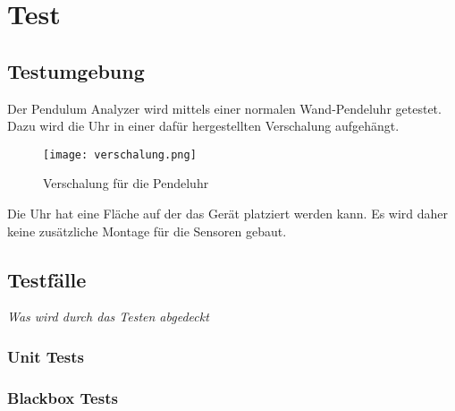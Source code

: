 \section{Test}
		\subsection{Testumgebung}
        Der Pendulum Analyzer wird mittels einer normalen Wand-Pendeluhr getestet. Dazu wird die Uhr in einer dafür hergestellten Verschalung aufgehängt.
        \begin{figure}[H]
            \centering
            \texttt{[image: verschalung.png]}
            \caption{Verschalung für die Pendeluhr}
        \end{figure}
    
        \noindent Die Uhr hat eine Fläche auf der das Gerät platziert werden kann. Es wird daher keine zusätzliche Montage für die Sensoren gebaut.
		\subsection{Testfälle}
			\textit{Was wird durch das Testen abgedeckt}
			\subsubsection{Unit Tests}
			\subsubsection{Blackbox Tests}
